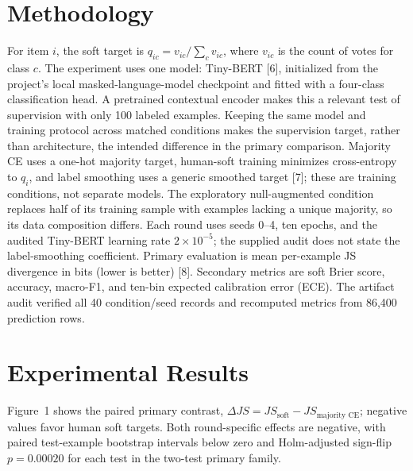 \documentclass[11pt,a4paper]{article}
\begin{document}
\section{Methodology}
For item $i$, the soft target is $q_{ic}=v_{ic}/\sum_c v_{ic}$, where $v_{ic}$ is the count of votes for class $c$. The experiment uses one model: Tiny-BERT [6], initialized from the project's local masked-language-model checkpoint and fitted with a four-class classification head. A pretrained contextual encoder makes this a relevant test of supervision with only 100 labeled examples. Keeping the same model and training protocol across matched conditions makes the supervision target, rather than architecture, the intended difference in the primary comparison. Majority CE uses a one-hot majority target, human-soft training minimizes cross-entropy to $q_i$, and label smoothing uses a generic smoothed target [7]; these are training conditions, not separate models. The exploratory null-augmented condition replaces half of its training sample with examples lacking a unique majority, so its data composition differs. Each round uses seeds 0--4, ten epochs, and the audited Tiny-BERT learning rate $2\times10^{-5}$; the supplied audit does not state the label-smoothing coefficient. Primary evaluation is mean per-example JS divergence in bits (lower is better) [8]. Secondary metrics are soft Brier score, accuracy, macro-F1, and ten-bin expected calibration error (ECE). The artifact audit verified all 40 condition/seed records and recomputed metrics from 86,400 prediction rows.

\section{Experimental Results}
Figure~1 shows the paired primary contrast, $\Delta JS=JS_{\text{soft}}-JS_{\text{majority CE}}$; negative values favor human soft targets. Both round-specific effects are negative, with paired test-example bootstrap intervals below zero and Holm-adjusted sign-flip $p=0.00020$ for each test in the two-test primary family.
\end{document}
